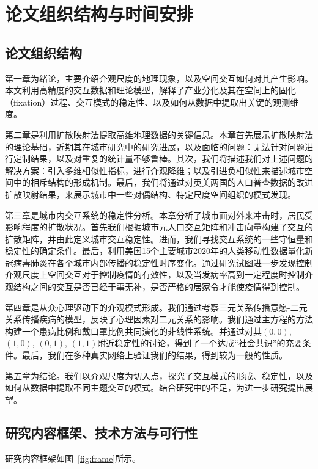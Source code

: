 \chapter{论文组织结构与时间安排}

\section{论文组织结构}

第一章为绪论，主要介绍介观尺度的地理现象，以及空间交互如何对其产生影响。本文利用高精度的交互数据和理论模型，解释了产业分化及其在空间上的固化（fixation）过程、交互模式的稳定性、以及如何从数据中提取出关键的观测维度。

第二章是利用扩散映射法提取高维地理数据的关键信息。本章首先展示扩散映射法的理论基础，近期其在城市研究中的研究进展，以及面临的问题：无法针对问题进行定制结果，以及对重复的统计量不够鲁棒。其次，我们将描述我们对上述问题的解决方案：引入多维相似性指标，进行介观降维；以及引进负相似性来描述城市空间中的相斥结构的形成机制。最后，我们将通过对英美两国的人口普查数据的改进扩散映射结果，来展示城市中一些对偶结构、特定尺度空间组织的模式发现。

第三章是城市内交互系统的稳定性分析。本章分析了城市面对外来冲击时，居民受影响程度的扩散状况。首先我们根据城市元人口交互矩阵和冲击向量构建了交互的扩散矩阵，并由此定义城市交互稳定性。进而，我们寻找交互系统的一些守恒量和稳定性的确定条件。最后，利用美国15个主要城市2020年的人类移动性数据量化新冠病毒肺炎在各个城市内部传播的稳定性时序变化。通过研究试图进一步发现控制介观尺度上空间交互对于控制疫情的有效性，以及当发病率高到一定程度时控制介观结构之间的交互是否已经于事无补，是否严格的居家令才能使疫情得到控制。

第四章是从众心理驱动下的介观模式形成。我们通过考察三元关系传播意愿-二元关系传播疾病的模型，反映了心理因素对二元关系的影响。我们通过主方程的方法构建一个患病比例和戴口罩比例共同演化的非线性系统。并通过对其$(0,0)$, $(1,0)$, $(0,1)$, $(1,1)$附近稳定性的讨论，得到了一个达成“社会共识”的充要条件。最后，我们在多种真实网络上验证我们的结果，得到较为一般的性质。

第五章为结论。我们以介观尺度为切入点，探究了交互模式的形成、稳定性，以及如何从数据中提取不同主题交互的模式。结合研究中的不足，为进一步研究提出展望。

\section{研究内容框架、技术方法与可行性}

研究内容框架如图~\ref{fig:frame}所示。

